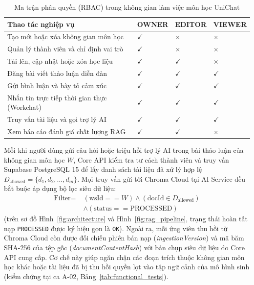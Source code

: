 \documentclass{IEEEtran}
\begin{document}
\begin{table}[t]
\caption{Ma trận phân quyền (RBAC) trong không gian làm việc môn học UniChat}
\label{tab:permission_matrix}
\centering
\footnotesize
\setlength{\tabcolsep}{3pt}
\begin{tabularx}{\columnwidth}{|Y|C{1.15cm}|C{1.15cm}|C{1.2cm}|}
\hline
\textbf{Thao tác nghiệp vụ} & \textbf{OWNER} & \textbf{EDITOR} & \textbf{VIEWER} \\
\hline
Tạo mới hoặc xóa không gian môn học & $\checkmark$ & $\times$ & $\times$ \\
Quản lý thành viên và chỉ định vai trò & $\checkmark$ & $\times$ & $\times$ \\
Tải lên, cập nhật hoặc xóa học liệu & $\checkmark$ & $\checkmark$ & $\times$ \\
Đăng bài viết thảo luận diễn đàn & $\checkmark$ & $\checkmark$ & $\checkmark$ \\
Gửi bình luận và bày tỏ cảm xúc & $\checkmark$ & $\checkmark$ & $\checkmark$ \\
Nhắn tin trực tiếp thời gian thực (Workchat) & $\checkmark$ & $\checkmark$ & $\checkmark$ \\
Truy vấn tài liệu và gọi trợ lý AI & $\checkmark$ & $\checkmark$ & $\checkmark$ \\
Xem báo cáo đánh giá chất lượng RAG & $\checkmark$ & $\checkmark$ & $\times$ \\
\hline
\end{tabularx}
\end{table}

Mỗi khi người dùng gửi câu hỏi hoặc triệu hồi trợ lý AI trong bài thảo luận của không gian môn học $W$, Core API kiểm tra tư cách thành viên và truy vấn Supabase PostgreSQL 15 để lấy danh sách tài liệu đã xử lý hợp lệ $D_{\text{allowed}} = \{d_1, d_2, \dots, d_m\}$. Mọi truy vấn gửi tới Chroma Cloud tại AI Service đều bắt buộc áp dụng bộ lọc siêu dữ liệu:
\begin{equation}
\label{eq:rbac_filter}
\begin{aligned}
\text{Filter} =\; &(\text{wsId} == W) \land (\text{docId} \in D_{\text{allowed}}) \\
&\land (\text{status} == \text{PROCESSED})
\end{aligned}
\end{equation}
(trên sơ đồ Hình~\ref{fig:architecture} và Hình~\ref{fig:rag_pipeline}, trạng thái hoàn tất nạp \texttt{PROCESSED} được ký hiệu gọn là \texttt{OK}). Ngoài ra, mỗi ứng viên thu hồi từ Chroma Cloud còn được đối chiếu phiên bản nạp (\textit{ingestionVersion}) và mã băm SHA-256 của tệp gốc (\textit{documentContentHash}) với bản chụp siêu dữ liệu do Core API cung cấp. Cơ chế này giúp ngăn chặn các đoạn trích thuộc không gian môn học khác hoặc tài liệu đã bị thu hồi quyền lọt vào tập ngữ cảnh của mô hình sinh (kiểm chứng tại ca A-02, Bảng~\ref{tab:functional_tests}).
\end{document}
